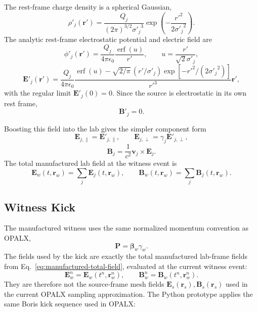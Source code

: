 \documentclass[11pt]{article}
\newcommand{\vect}[1]{\boldsymbol{#1}}
\newcommand{\E}{\vect{E}}
\newcommand{\B}{\vect{B}}
\newcommand{\Pmom}{\vect{P}}
\newcommand{\betav}{\boldsymbol{\beta}}
\numberwithin{equation}{section}
\begin{document}
The rest-frame charge density is a spherical Gaussian,
\begin{equation}
  \rho'_j(\vect r')
  =
  \frac{Q_j}{(2\pi)^{3/2}{\sigma'_j}^3}
  \exp\left(-\frac{r'^2}{2{\sigma'_j}^2}\right).
\end{equation}
The analytic rest-frame electrostatic potential and electric field are
\begin{equation}
  \phi'_j(\vect r')
  =
  \frac{Q_j}{4\pi\epsilon_0}
  \frac{\operatorname{erf}(u)}{r'},
  \qquad
  u = \frac{r'}{\sqrt{2}\sigma'_j},
\end{equation}
\begin{equation}
  \E'_j(\vect r')
  =
  \frac{Q_j}{4\pi\epsilon_0}
  \frac{
    \operatorname{erf}(u)
    -
    \sqrt{2/\pi}\,(r'/\sigma'_j)
    \exp[-r'^2/(2{\sigma'_j}^2)]
  }{r'^3}
  \vect r',
\end{equation}
with the regular limit \(\E'_j(0)=0\).  Since the source is electrostatic in its
own rest frame,
\begin{equation}
  \B'_j = 0.
\end{equation}

Boosting this field into the lab gives the simpler component form
\begin{equation}
  \E_{j,\parallel} = \E'_{j,\parallel},
  \qquad
  \E_{j,\perp} = \gamma_j \E'_{j,\perp},
\end{equation}
\begin{equation}
  \B_j = \frac{1}{c^2}\vect v_j \times \E_j.
\end{equation}
The total manufactured lab field at the witness event is
\begin{equation}
  \label{eq:manufactured-total-field}
  \E_w(t,\vect r_w) = \sum_j \E_j(t,\vect r_w),
  \qquad
  \B_w(t,\vect r_w) = \sum_j \B_j(t,\vect r_w).
\end{equation}

\subsection{Witness Kick}

The manufactured witness uses the same normalized momentum convention as OPALX,
\begin{equation}
  \Pmom = \betav_w\gamma_w .
\end{equation}
The fields used by the kick are exactly the total manufactured lab-frame fields
from Eq.~\eqref{eq:manufactured-total-field}, evaluated at the current witness
event:
\begin{equation}
  \E_w^n = \E_w(t^n,\vect r_w^n),
  \qquad
  \B_w^n = \B_w(t^n,\vect r_w^n).
\end{equation}
They are therefore not the source-frame mesh fields
\(\E_s(\vect r_s),\B_s(\vect r_s)\) used in the current OPALX sampling
approximation.  The Python prototype applies the same Boris kick sequence used
in OPALX:
\end{document}
